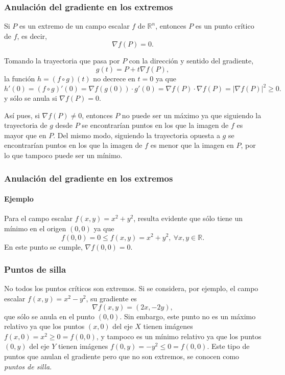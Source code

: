 \begin{frame}
\frametitle{Anulación del gradiente en los extremos}
\begin{teorema}
Si $P$ es un extremo de un campo escalar $f$ de $\mathbb{R}^n$, entonces $P$ es un punto crítico de $f$, es decir,
\[
\nabla f(P) = 0.
\]
\end{teorema}

 Tomando la trayectoria que pasa por $P$ con la dirección y sentido del gradiente,
\[
g(t)=P+t\nabla f(P),
\] 
la función $h=(f\circ g)(t)$ no decrece en $t=0$ ya que 
\[
h'(0)= (f\circ g)'(0) = \nabla f(g(0))\cdot g'(0) = \nabla f(P)\cdot \nabla f(P) = |\nabla f(P)|^2\geq 0.
\]
y sólo se anula si $\nabla f(P)=0$.

Así pues, si $\nabla f(P)\neq 0$, entonces $P$ no puede ser un máximo ya que siguiendo la trayectoria de $g$ desde $P$ se encontrarían puntos en los que la imagen de $f$ es mayor que en $P$.
Del mismo modo, siguiendo la trayectoria opuesta a $g$ se encontrarían puntos en los que la imagen de $f$ es menor que la imagen en $P$, por lo que tampoco puede ser un mínimo. 
\end{frame}


\begin{frame}
\frametitle{Anulación del gradiente en los extremos}
\framesubtitle{Ejemplo}
Para el campo escalar $f(x,y)=x^2+y^2$, resulta evidente que sólo tiene un mínimo en el origen $(0,0)$ ya que 
\[
f(0,0)=0 \leq f(x,y)=x^2+y^2,\ \forall x,y\in \mathbb{R}.
\]
En este punto se cumple, $\nabla f(0,0) = 0$.
\begin{center}
\scalebox{1}{}
\end{center}
\end{frame}


\begin{frame}
\frametitle{Puntos de silla}
No todos los puntos críticos son extremos. 
Si se considera, por ejemplo, el campo escalar $f(x,y)=x^2-y^2$, su gradiente es
\[
\nabla f(x,y) = (2x,-2y),
\]
que sólo se anula en el punto $(0,0)$. 
Sin embargo, este punto no es un máximo relativo ya que los puntos $(x,0)$ del eje $X$ tienen imágenes $f(x,0)=x^2\geq
0=f(0,0)$, y tampoco es un mínimo relativo ya que los puntos $(0,y)$ del eje $Y$ tienen imágenes $f(0,y)=-y^2\leq
0=f(0,0)$.
Este tipo de puntos que anulan el gradiente pero que no son extremos, se conocen como \emph{puntos de silla}.
\begin{center}
\scalebox{1}{}
\end{center}
\end{frame}


